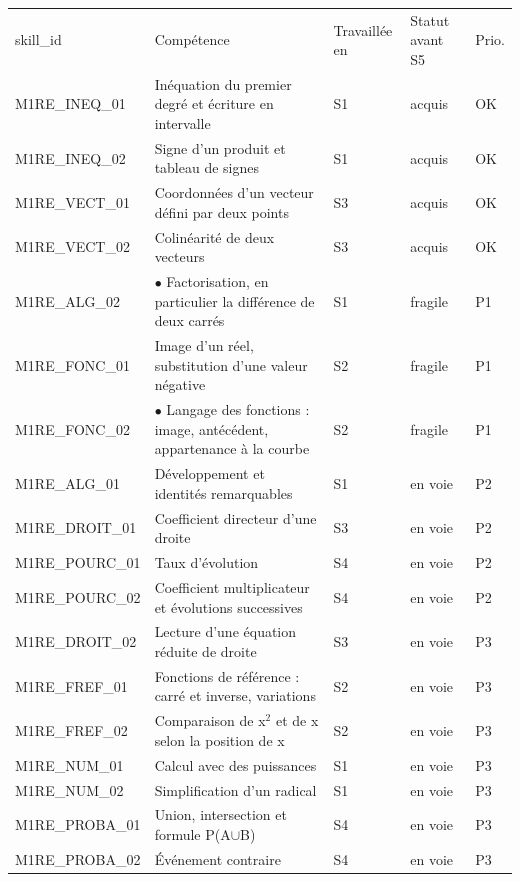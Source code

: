 \documentclass[10pt,a4paper]{article}
\begin{document}
\par\noindent\begin{tabularx}{\linewidth}{>{\ttfamily\scriptsize}p{27mm} X >{\scriptsize}p{16mm} >{\scriptsize}p{20mm} >{\scriptsize\centering\arraybackslash}p{9mm}}
\rowcolor{Navy}\color{white}\scriptsize skill\_id & \color{white}Compétence & \color{white}Travaillée en & \color{white}Statut avant S5 & \color{white}Prio. \\
M1RE\_INEQ\_01 & Inéquation du premier degré et écriture en intervalle & S1 & acquis & OK \\
M1RE\_INEQ\_02 & Signe d'un produit et tableau de signes & S1 & acquis & OK \\
M1RE\_VECT\_01 & Coordonnées d'un vecteur défini par deux points & S3 & acquis & OK \\
M1RE\_VECT\_02 & Colinéarité de deux vecteurs & S3 & acquis & OK \\
M1RE\_ALG\_02 & $\bullet$ Factorisation, en particulier la différence de deux carrés & S1 & fragile & P1 \\
M1RE\_FONC\_01 & Image d'un réel, substitution d'une valeur négative & S2 & fragile & P1 \\
M1RE\_FONC\_02 & $\bullet$ Langage des fonctions : image, antécédent, appartenance à la courbe & S2 & fragile & P1 \\
M1RE\_ALG\_01 & Développement et identités remarquables & S1 & en voie & P2 \\
M1RE\_DROIT\_01 & Coefficient directeur d'une droite & S3 & en voie & P2 \\
M1RE\_POURC\_01 & Taux d'évolution & S4 & en voie & P2 \\
M1RE\_POURC\_02 & Coefficient multiplicateur et évolutions successives & S4 & en voie & P2 \\
M1RE\_DROIT\_02 & Lecture d'une équation réduite de droite & S3 & en voie & P3 \\
M1RE\_FREF\_01 & Fonctions de référence : carré et inverse, variations & S2 & en voie & P3 \\
M1RE\_FREF\_02 & Comparaison de x$^2$ et de x selon la position de x & S2 & en voie & P3 \\
M1RE\_NUM\_01 & Calcul avec des puissances & S1 & en voie & P3 \\
M1RE\_NUM\_02 & Simplification d'un radical & S1 & en voie & P3 \\
M1RE\_PROBA\_01 & Union, intersection et formule P(A$\cup$B) & S4 & en voie & P3 \\
M1RE\_PROBA\_02 & Événement contraire & S4 & en voie & P3 \\
\end{tabularx}
\end{document}

